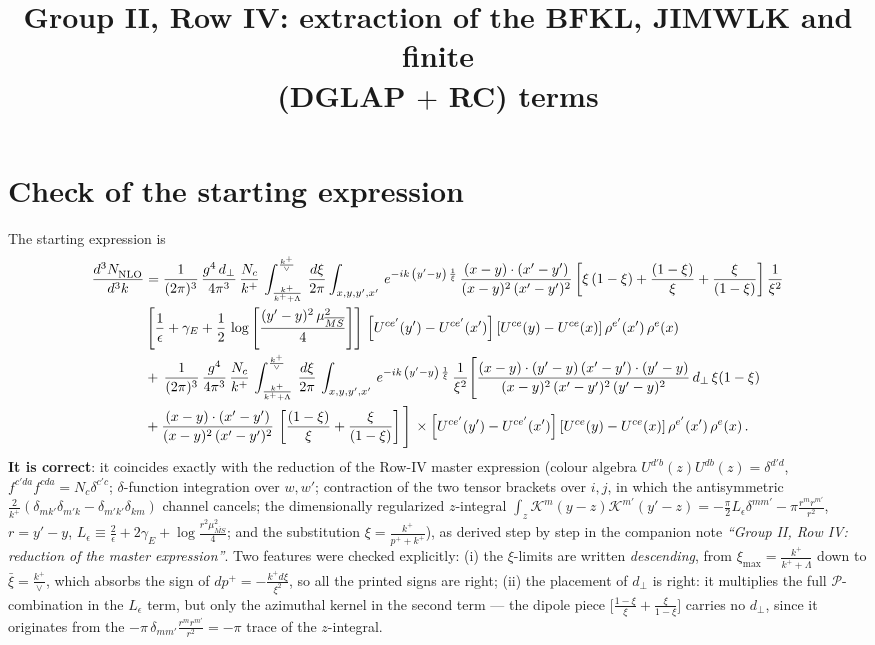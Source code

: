\documentclass[10pt]{article}
\title{Group II, Row IV: extraction of the BFKL, JIMWLK and finite\\ (DGLAP $+$ RC) terms}
\author{}
\date{}
\newcommand{\Leps}{L_{\epsilon}}
\newcommand{\Wbr}{\left[U^{ce'}(y') - U^{ce'}(x')\right] \left[U^{ce}(y) - U^{ce}(x)\right] \rho^{e'}(x')\, \rho^{e}(x)}
\begin{document}
\maketitle
\vspace{-2.5em}

\section{Check of the starting expression}
The starting expression is
\begin{align}\label{eq:start}
     \frac{d^{3}N_{\rm NLO}^{\rm}}{d^{3}k}  & =  \frac{1}{(2\pi)^{3}}\,\frac{g^{4}\,d_{\perp}}{4\pi^{3}}\,\frac{N_{c}}{k^{+}}\,\int_{\frac{k^{+}}{k^{+}+\Lambda}}^{\frac{k^{+}}{\vee}}\, \frac{d\xi}{2\pi}\int_{x,y,y^{\prime},x'}\,e^{-ik\,\left(y'-y\right)\,\frac{1}{\xi}}\,\frac{(x-y)\cdot (x'-y')}{(x-y)^{2}\,(x'-y')^{2}}\,\bigg[\xi\,(1-\xi)+\frac{(1-\xi)}{\xi}+\frac{\xi}{(1-\xi)}\bigg]\,\frac{1}{\xi^{2}}\notag \\ & \left[\frac{1}{\epsilon} +\gamma_{E} +\frac{1}{2}\,\log{\left[\frac{(y'-y)^{2}\,\mu^{2}_{\overline{MS}}}{4}\right]}\right]\,\Wbr\notag \\ & +\,\frac{1}{(2\pi)^{3}}\,\frac{g^{4}}{4\pi^{3}}\,\frac{N_{c}}{k^{+}}\,\int_{\frac{k^{+}}{k^{+}+\Lambda}}^{\frac{k^{+}}{\vee}}\, \frac{d\xi}{2\pi}\,\int_{x,y,y^{\prime},x'}\,e^{-ik\,\left(y'-y\right)\,\frac{1}{\xi}}\,\frac{1}{\xi^{2}}\Bigg[\frac{(x-y)\cdot (y'-y)\, (x'-y')\cdot (y'-y)}{(x-y)^{2}\,(x'-y')^{2}\,(y'-y)^{2}}\,d_{\perp}\,\xi(1-\xi)\notag \\ & + \frac{(x-y)\cdot (x'-y')}{(x-y)^{2}\,(x'-y')^{2}}\,\left[\frac{(1-\xi)}{\xi}+\frac{\xi}{(1-\xi)}\right]\Bigg]\,\times \Wbr\,.
\end{align}
\textbf{It is correct}: it coincides exactly with the reduction of the Row-IV master expression
(colour algebra $U^{d'b}(z)U^{db}(z)=\delta^{d'd}$, $f^{c'da}f^{cda}=N_c\delta^{c'c}$;
$\delta$-function integration over $w,w'$; contraction of the two tensor brackets over $i,j$,
in which the antisymmetric $\frac{2}{k^{+}}(\delta_{mk'}\delta_{m'k}-\delta_{m'k'}\delta_{km})$
channel cancels; the dimensionally regularized $z$-integral
$\int_{z}\mathcal K^{m}(y-z)\mathcal K^{m'}(y'-z)=-\frac{\pi}{2}\Leps\delta^{mm'}-\pi\frac{r^{m}r^{m'}}{r^{2}}$,
$r=y'-y$, $\Leps\equiv\frac{2}{\epsilon}+2\gamma_{E}+\log\frac{r^{2}\mu^{2}_{\overline{MS}}}{4}$;
and the substitution $\xi=\frac{k^{+}}{p^{+}+k^{+}}$), as derived step by step in the companion note
\emph{``Group II, Row IV: reduction of the master expression''}. Two features were checked
explicitly: (i) the $\xi$-limits are written \emph{descending}, from
$\xi_{\max}=\frac{k^{+}}{k^{+}+\Lambda}$ down to $\bar\xi=\frac{k^{+}}{\vee}$, which absorbs the sign
of $dp^{+}=-\frac{k^{+}d\xi}{\xi^{2}}$, so all the printed signs are right; (ii) the placement of
$d_{\perp}$ is right: it multiplies the full $\mathcal P$-combination in the $\Leps$ term, but only
the azimuthal kernel in the second term --- the dipole piece
$\big[\frac{1-\xi}{\xi}+\frac{\xi}{1-\xi}\big]$ carries no $d_{\perp}$, since it originates from the
$-\pi\,\delta_{mm'}\frac{r^{m}r^{m'}}{r^{2}}=-\pi$ trace of the $z$-integral.
\end{document}

